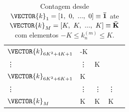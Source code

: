 \begin{minipage}{0.45\textwidth}
\begin{table}[H]
\begin{tabular}{|l||l|l|l|l|}
$\VECTOR{k}_{6K^2+4K+1}$& -K& \multirow{3}{*}{K}  &                     &                       \\ \cline{1-2}
\vdots             & \vdots &                     &                     &                       \\ \cline{1-2}
$\VECTOR{k}_{6K^2+6K+1}$& K &                     &                     &                       \\ \cline{1-4}
\vdots             & \vdots & \vdots              & \vdots              &                       \\ \cline{1-4}
$\VECTOR{k}_{M}$   & K      & K                   & K                   &                       \\ \hline
\end{tabular}
\caption{Contagem desde $\VECTOR{k}_{1}=[1,~ 0,~ ...,~ 0 ]\equiv \mathbf{\bar{1}}$ 
ate $\VECTOR{k}_{M}=[K,~ K,~ ...,~ K ]\equiv \mathbf{\bar{K}}$ com elementos $-K\leq k_n^{(m)}\leq K$.}
\label{tab:theo:reglogrnr1fourier:1}
\end{table}
\end{minipage}


